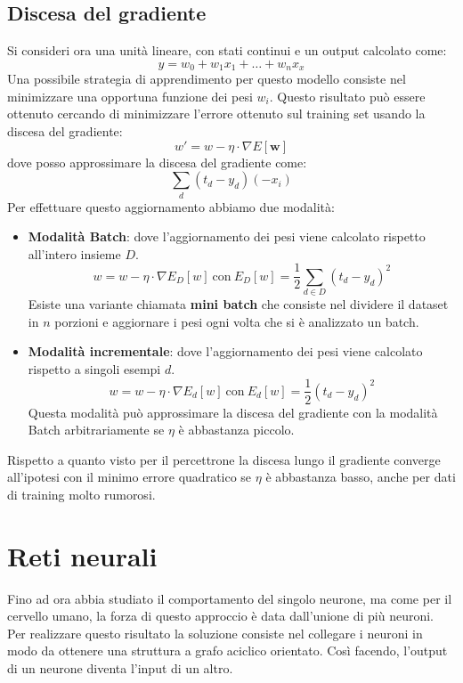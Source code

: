\subsection{Discesa del gradiente}
Si consideri ora una unità lineare, con stati continui e un output calcolato come:
\begin{equation}
    y = w_0 + w_1x_1 + \dots + w_nx_x
\end{equation}
Una possibile strategia di apprendimento per questo modello consiste nel minimizzare
una opportuna funzione dei pesi $w_i$. Questo risultato può essere ottenuto cercando
di minimizzare l'errore ottenuto sul training set usando la discesa del gradiente:
\begin{equation}
    w' = w - \eta \cdot \nabla E[\textbf{w}]
\end{equation}
dove posso approssimare la discesa del gradiente come:
\begin{equation}
    \sum_d (t_d - y_d) (- x_i)
\end{equation}
Per effettuare questo aggiornamento abbiamo due modalità:
\begin{itemize}
    \item \textbf{Modalità Batch}: dove l'aggiornamento dei pesi viene calcolato
          rispetto all'intero insieme $D$.
          \begin{equation}
              w = w - \eta \cdot \nabla E_D[w] \ \text{con} \ E_D[w] = \frac{1}{2} \sum_{d \in D} (t_d - y_d)^2
          \end{equation}
          Esiste una variante chiamata \textbf{mini batch} che consiste nel dividere
          il dataset in $n$ porzioni e aggiornare i pesi ogni volta che si è
          analizzato un batch.
    \item \textbf{Modalità incrementale}: dove l'aggiornamento dei pesi viene
          calcolato rispetto a singoli esempi $d$.
          \begin{equation}
              w = w - \eta \cdot \nabla E_d[w] \ \text{con} \ E_d[w] = \frac{1}{2} (t_d - y_d)^2
          \end{equation}
          Questa modalità può approssimare la discesa del gradiente con la
          modalità Batch arbitrariamente se $\eta$ è abbastanza piccolo.
\end{itemize}

Rispetto a quanto visto per il percettrone la discesa lungo il gradiente converge
all'ipotesi con il minimo errore quadratico se $\eta$ è abbastanza basso, anche
per dati di training molto rumorosi.
\section{Reti neurali}
Fino ad ora abbia studiato il comportamento del singolo neurone, ma come per il
cervello umano, la forza di questo approccio è data dall'unione di più neuroni.
Per realizzare questo risultato la soluzione consiste nel collegare i neuroni in
modo da ottenere una struttura a grafo aciclico orientato. Così facendo, l'output
di un neurone diventa l'input di un altro.

